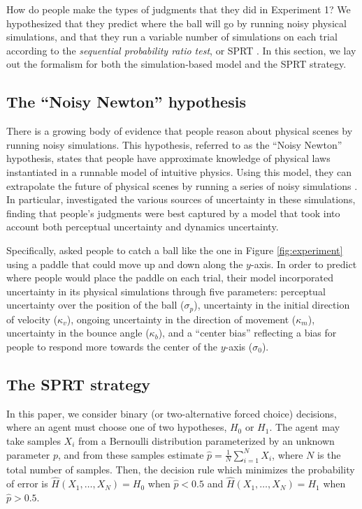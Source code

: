 \documentclass[10pt,letterpaper]{article}
\begin{document}
How do people make the types of judgments that they did in Experiment 1? We hypothesized that they predict where the ball will go by running noisy physical simulations, and that they run a variable number of simulations on each trial according to the \textit{sequential probability ratio test}, or SPRT \cite{wald1947sequential}. In this section, we lay out the formalism for both the simulation-based model and the SPRT strategy.

\subsection{The ``Noisy Newton'' hypothesis}

There is a growing body of evidence that people reason about physical scenes by running noisy simulations. This hypothesis, referred to as the ``Noisy Newton'' hypothesis, states that people have approximate knowledge of physical laws instantiated in a runnable model of intuitive physics. Using this model, they can extrapolate the future of physical scenes by running a series of noisy simulations \cite{Smith:2013fc,Battaglia2013,Smith:2013ug,Smith:2013th,Smith:2014tx,Ullman:2014ut,Hamrick:2015}. In particular,  investigated the various sources of uncertainty in these simulations, finding that people's judgments were best captured by a model that took into account both perceptual uncertainty and dynamics uncertainty.

Specifically,  asked people to catch a ball like the one in Figure \ref{fig:experiment} using a paddle that could move up and down along the $y$-axis. In order to predict where people would place the paddle on each trial, their model incorporated uncertainty in its physical simulations through five parameters: perceptual uncertainty over the position of the ball ($\sigma_p$), uncertainty in the initial direction of velocity ($\kappa_v$), ongoing uncertainty in the direction of movement ($\kappa_m$), uncertainty in the bounce angle ($\kappa_b$), and a ``center bias'' reflecting a bias for people to respond more towards the center of the $y$-axis ($\sigma_0$).

\subsection{The SPRT strategy}

In this paper, we consider binary (or two-alternative forced choice) decisions, where an agent must choose one of two hypotheses, $H_0$ or $H_1$. The agent may take samples $X_i$ from a Bernoulli distribution parameterized by an unknown parameter $p$, and from these samples estimate $\hat{p}=\frac{1}{N}\sum_{i=1}^N X_i$, where $N$ is the total number of samples. Then, the decision rule which minimizes the probability of error is $\hat{H}(X_1,\ldots{},X_N)=H_0$ when $\hat{p}<0.5$ and $\hat{H}(X_1,\ldots{},X_N)=H_1$ when $\hat{p}>0.5$.
\end{document}
